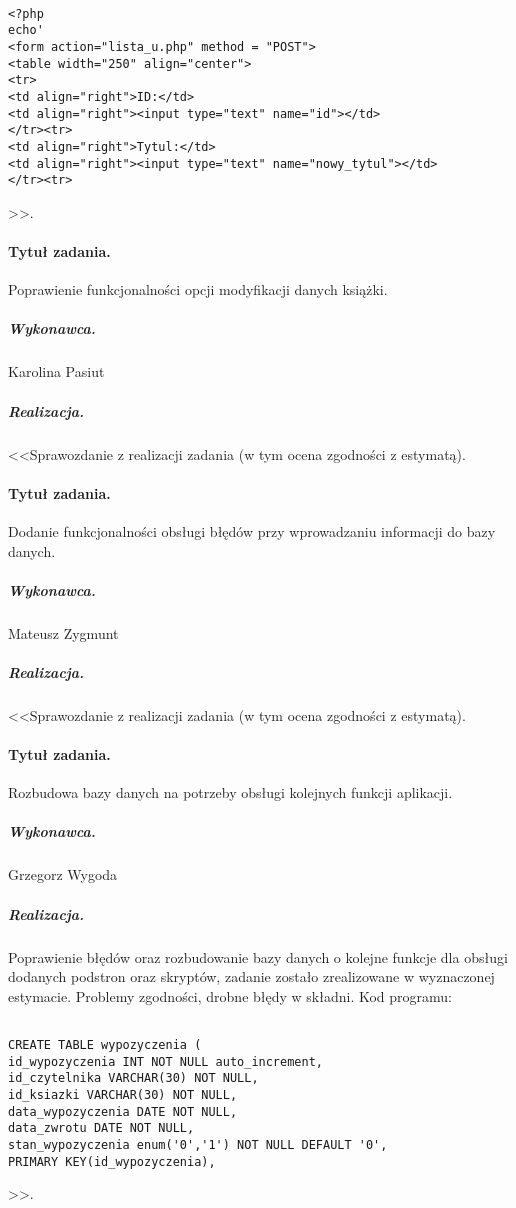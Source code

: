 \documentclass[a4paper]{article}
\begin{document}
\begin{verbatim}

<?php
echo'
<form action="lista_u.php" method = "POST">
<table width="250" align="center">
<tr>
<td align="right">ID:</td>
<td align="right"><input type="text" name="id"></td>
</tr><tr>
<td align="right">Tytul:</td>
<td align="right"><input type="text" name="nowy_tytul"></td>
</tr><tr>

\end{verbatim}>>.

\paragraph{Tytuł zadania.} Poprawienie funkcjonalności opcji modyfikacji danych książki.
\subparagraph{Wykonawca.} Karolina Pasiut
\subparagraph{Realizacja.} <<Sprawozdanie z realizacji zadania (w tym ocena zgodności z estymatą).



\paragraph{Tytuł zadania.} Dodanie funkcjonalności obsługi błędów przy wprowadzaniu informacji do bazy danych.
\subparagraph{Wykonawca.} Mateusz Zygmunt
\subparagraph{Realizacja.} <<Sprawozdanie z realizacji zadania (w tym ocena zgodności z estymatą).



\paragraph{Tytuł zadania.}  Rozbudowa bazy danych na potrzeby obsługi kolejnych funkcji aplikacji.
\subparagraph{Wykonawca.} Grzegorz Wygoda
\subparagraph{Realizacja.} Poprawienie błędów oraz rozbudowanie bazy danych o kolejne funkcje dla obsługi dodanych podstron oraz skryptów, zadanie zostało zrealizowane w wyznaczonej estymacie. Problemy zgodności, drobne błędy w składni. Kod programu:

\begin{verbatim}

CREATE TABLE wypozyczenia (
id_wypozyczenia INT NOT NULL auto_increment,
id_czytelnika VARCHAR(30) NOT NULL,
id_ksiazki VARCHAR(30) NOT NULL,
data_wypozyczenia DATE NOT NULL,
data_zwrotu DATE NOT NULL,
stan_wypozyczenia enum('0','1') NOT NULL DEFAULT '0',
PRIMARY KEY(id_wypozyczenia),

\end{verbatim}>>.
\end{document}

